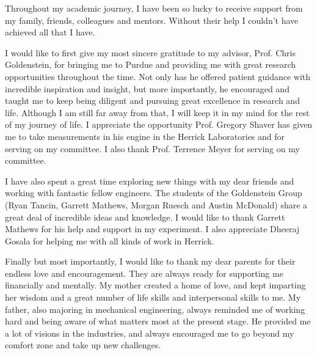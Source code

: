 \begin{acknowledgments}
Throughout my academic journey, I have been so lucky to receive support from my family, friends, colleagues and mentors. Without their help I couldn't have achieved all that I have.

I would like to first give my most sincere gratitude to my advisor, Prof. Chris Goldenstein, for bringing me to Purdue and providing me with great research opportunities throughout the time. Not only has he offered patient guidance with incredible inspiration and insight, but more importantly, he encouraged and taught me to keep being diligent and pursuing great excellence in research and life. Although I am still far away from that, I will keep it in my mind for the rest of my journey of life. I appreciate the opportunity Prof. Gregory Shaver has given me to take measurements in his engine in the Herrick Laboratories and for serving on my committee. I also thank Prof. Terrence Meyer for serving on my committee. 

I have also spent a great time exploring new things with my dear friends and working with fantastic fellow engineers. The students of the Goldenstein Group (Ryan Tancin, Garrett Mathews, Morgan Ruesch and Austin McDonald) share a great deal of incredible ideas and knowledge. I would like to thank Garrett Mathews for his help and support in my experiment. I also appreciate Dheeraj Gosala for helping me with all kinds of work in Herrick.

Finally but most importantly, I would like to thank my dear parents for their endless love and encouragement. They are always ready for supporting me financially and mentally. My mother created a home of love, and kept imparting her wisdom and a great number of life skills and interpersonal skills to me. My father, also majoring in mechanical engineering, always reminded me of working hard and being aware of what matters most at the present stage. He provided me a lot of visions in the industries, and always encouraged me to go beyond my comfort zone and take up new challenges.

\end{acknowledgments}


